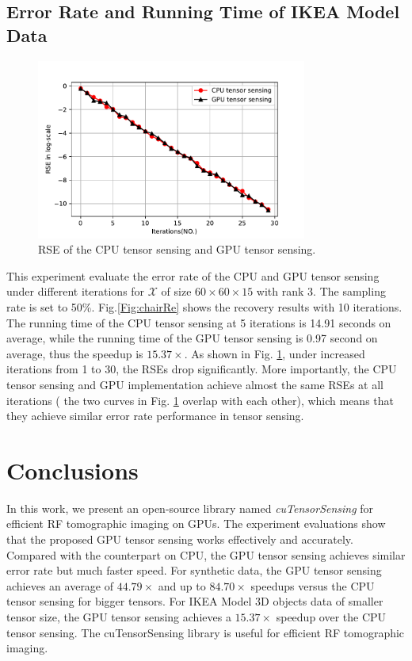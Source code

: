 \documentclass[futureinternet,article,submit,moreauthors,pdftex,10pt,a4paper]{Definitions/mdpi}
\theoremstyle{plain}
\theoremstyle{definition}
\theoremstyle{remark}
\begin{document}
\subsection{Error Rate and Running Time of IKEA Model Data}
\begin{figure}[t]
    \centering
    \includegraphics[width=3.5in]{rse.pdf}
    \caption{RSE of the CPU tensor sensing and GPU tensor sensing.}
    \label{pic:rse}
\end{figure}

This experiment evaluate the error rate of the CPU and GPU tensor sensing under different iterations for $\mathcal{X}$ of size $60 \times 60 \times 15$ with rank 3. The sampling rate is set to 50\%. Fig.\ref{Fig:chairRe} shows the recovery results with 10 iterations. The running time of the CPU tensor sensing at 5 iterations is 14.91 seconds on average, while the running time of the GPU tensor sensing is 0.97 second on average, thus the speedup is $15.37 \times$. As shown in Fig. \ref{pic:rse}, under increased iterations from 1 to 30, the RSEs drop significantly. More importantly, the CPU tensor sensing and GPU implementation achieve almost the same RSEs at all iterations ( the two curves in Fig. \ref{pic:rse} overlap with each other), which means that they achieve similar error rate performance in tensor sensing.

\section{Conclusions}
\label{SEC_CON}
In this work, we present an open-source library named \textit{cuTensorSensing} for efficient RF tomographic imaging on GPUs. The experiment evaluations show that the proposed GPU tensor sensing works effectively and accurately. Compared with the counterpart on CPU, the GPU tensor sensing achieves similar error rate but much faster speed. For synthetic data, the GPU tensor sensing achieves an average of $44.79 \times$ and up to $84.70 \times$ speedups versus the CPU tensor sensing for bigger tensors. For IKEA Model 3D objects data of smaller tensor size, the GPU tensor sensing achieves a $15.37 \times$ speedup over the CPU tensor sensing. The cuTensorSensing library is useful for efficient RF tomographic imaging.
\end{document}
